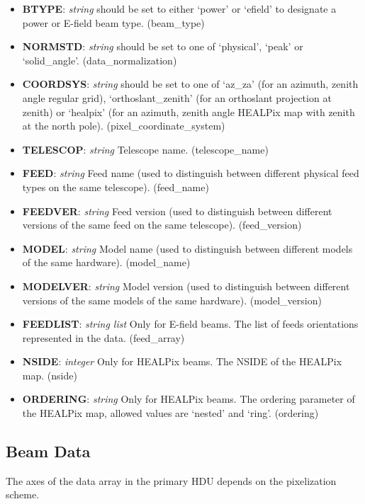 \documentclass[11pt, oneside]{article}   	%
\begin{document}
\begin{itemize}
\item{\textbf{BTYPE}: \textit{string} should be set to either `power' or `efield' to designate a power or E-field beam type. (beam\_type)}
\item{\textbf{NORMSTD}: \textit{string} should be set to one of `physical', `peak' or `solid\_angle'. (data\_normalization)}
\item{\textbf{COORDSYS}: \textit{string} should be set to one of `az\_za' (for an azimuth, zenith angle regular grid), `orthoslant\_zenith' (for an orthoslant projection at zenith) or `healpix' (for an azimuth, zenith angle HEALPix map with zenith at the north pole). (pixel\_coordinate\_system)}
\item{\textbf{TELESCOP}: \textit{string} Telescope name. (telescope\_name)}
\item{\textbf{FEED}: \textit{string} Feed name (used to distinguish between different physical feed types on the same telescope). (feed\_name)}
\item{\textbf{FEEDVER}: \textit{string} Feed version (used to distinguish between different versions of the same feed on the same telescope). (feed\_version)}
\item{\textbf{MODEL}: \textit{string} Model name  (used to distinguish between different models of the same hardware). (model\_name)}
\item{\textbf{MODELVER}: \textit{string} Model version (used to distinguish between different versions of the same models of the same hardware). (model\_version)}
\item{\textbf{FEEDLIST}: \textit{string list} Only for E-field beams. The list of feeds orientations represented in the data. (feed\_array)}
\item{\textbf{NSIDE}: \textit{integer} Only for HEALPix beams. The NSIDE of the HEALPix map. (nside)}
\item{\textbf{ORDERING}: \textit{string} Only for HEALPix beams. The ordering parameter of the HEALPix map, allowed values are `nested' and `ring'. (ordering)}
\end{itemize}

\subsection{Beam Data}
The axes of the data array in the primary HDU depends on the pixelization scheme.
\end{document}
